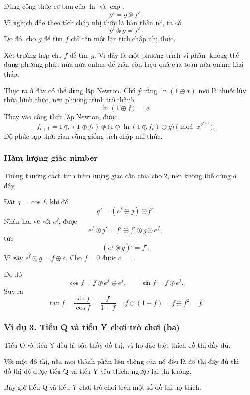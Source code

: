 \documentclass[11pt]{article}
\begin{document}
Dùng công thức cơ bản của \(\ln\) và \(\exp\):
\[
  g'=g\circledast f'.
\]
Vì nghịch đảo theo tích chập nhị thức là bản thân nó, ta có
\[
  g'\circledast g=f'.
\]
Do đó, cho \(g\) để tìm \(f\) chỉ cần một lần tích chập nhị thức.

Xét trường hợp cho \(f\) để tìm \(g\). Vì đây là một phương trình vi phân, không
thể dùng phương pháp nửa-nửa online để giải, còn hiệu quả của toàn-nửa online
khá thấp.

Thực ra ở đây có thể dùng lặp Newton. Chú ý rằng \(\ln(1\oplus x)\) mới là
chuỗi lũy thừa hình thức, nên phương trình trở thành
\[
  \ln(1\oplus f)=g.
\]
Thay vào công thức lặp Newton, được
\[
  f_{t+1}
  =
  1\oplus(1\oplus f_t)\circledast
  \bigl(1\oplus\ln(1\oplus f_t)\oplus g\bigr)
  \pmod {x^{2^{t+1}}}.
\]
Độ phức tạp thời gian cũng giống tích chập nhị thức.

\subsubsection{Hàm lượng giác nimber}

Thông thường cách tính hàm lượng giác cần chia cho \(2\), nên không thể dùng ở
đây.

Đặt \(g=\cos f\), khi đó
\[
  g'=(e^f\oplus g)\circledast f'.
\]
Nhân hai vế với \(e^f\), được
\[
  e^f\circledast g'
  =
  f'\oplus f'\circledast g\circledast e^f,
\]
tức
\[
  (e^f\circledast g)'=f'.
\]
Vì vậy \(e^f\circledast g=f\oplus c\). Cho \(f=0\) được \(c=1\).

Do đó
\[
  \cos f=f\circledast e^f\oplus e^f,\qquad
  \sin f=f\circledast e^f.
\]
Suy ra
\[
  \tan f=\frac{\sin f}{\cos f}=\frac{f}{1+f}
  =f\circledast(1+f)=f\oplus f^2=f.
\]

\subsubsection{Ví dụ 3. Tiểu Q và tiểu Y chơi trò chơi (ba)}

Tiểu Q và tiểu Y đều là bậc thầy đồ thị, và họ đặc biệt thích đồ thị đầy đủ.

Với một đồ thị, nếu mọi thành phần liên thông của nó đều là đồ thị đầy đủ thì
đồ thị đó được tiểu Q và tiểu Y yêu thích; ngược lại thì không.

Bây giờ tiểu Q và tiểu Y chơi trò chơi trên một số đồ thị họ thích.
\end{document}
